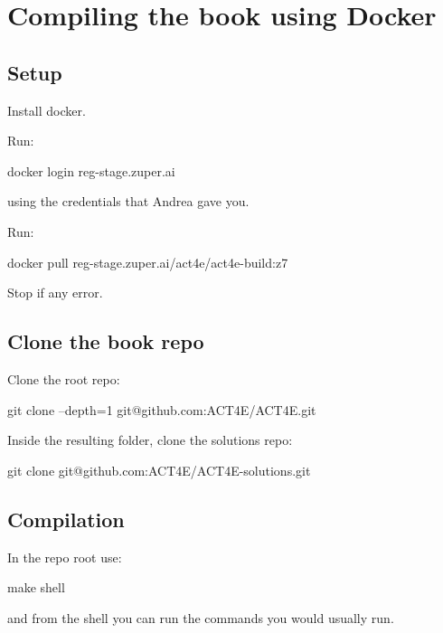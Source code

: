 

\section{Compiling the book using Docker}

\subsection{Setup}

Install docker.

Run:

\begin{console}
    docker login reg-stage.zuper.ai
\end{console}

using the credentials that Andrea gave you.

Run:

\begin{console}
    docker pull reg-stage.zuper.ai/act4e/act4e-build:z7
\end{console}

Stop if any error.


\subsection{Clone the book repo}

Clone the root repo:

\begin{console}
    git clone --depth=1  git@github.com:ACT4E/ACT4E.git
\end{console}

Inside the resulting folder, clone the solutions repo:

\begin{console}
    git clone git@github.com:ACT4E/ACT4E-solutions.git
\end{console}


\subsection{Compilation}

In the repo root use:

\begin{console}
    make shell
\end{console}

and from the shell you can run the commands you would usually run.

